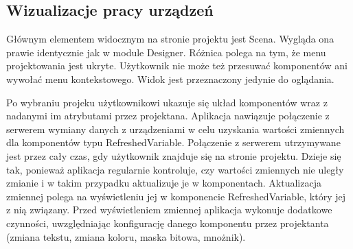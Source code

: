 \subsection{Wizualizacje pracy urządzeń}
Głównym elementem widocznym na stronie projektu jest Scena. Wygląda ona prawie identycznie jak w module Designer. Różnica polega na tym, że menu projektowania jest ukryte. Użytkownik nie może też przesuwać komponentów ani wywołać menu kontekstowego. Widok jest przeznaczony jedynie do oglądania.
	
Po wybraniu projeku użytkownikowi ukazuje się układ komponentów wraz z nadanymi im atrybutami przez projektana. Aplikacja nawiązuje połączenie z serwerem wymiany danych z urządzeniami w celu uzyskania wartości zmiennych dla komponentów typu RefreshedVariable. Połączenie z serwerem utrzymywane jest przez cały czas, gdy użytkownik znajduje się na stronie projektu. Dzieje się tak, ponieważ aplikacja regularnie kontroluje, czy wartości zmiennych nie uległy zmianie i w takim przypadku aktualizuje je w komponentach. Aktualizacja zmiennej polega na wyświetleniu jej w komponencie RefreshedVariable, który jej z nią związany. Przed wyświetleniem zmiennej aplikacja wykonuje dodatkowe czynności, uwzględniając konfigurację danego komponentu przez projektanta (zmiana tekstu, zmiana koloru, maska bitowa, mnożnik).